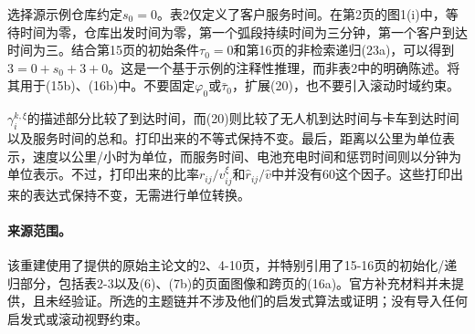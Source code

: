 \documentclass[10pt]{article}
\begin{document}
选择源示例仓库约定$s_0=0$。表2仅定义了客户服务时间。在第2页的图1(i)中，等待时间为零，仓库出发时间为零，第一个弧段持续时间为三分钟，第一个客户到达时间为三。结合第15页的初始条件$\tau_0=0$和第16页的非检索递归(23a)，可以得到$3=0+s_0+3+0$。这是一个基于示例的注释性推理，而非表2中的明确陈述。将其用于(15b)、(16b)中。不要固定$\varphi_0$或$\bar\tau_0$，扩展(20)，也不要引入滚动时域约束。

$\gamma_i^{k,\xi}$的描述部分比较了到达时间，而(20)则比较了无人机到达时间与卡车到达时间以及服务时间的总和。打印出来的不等式保持不变。最后，距离以公里为单位表示，速度以公里/小时为单位，而服务时间、电池充电时间和惩罚时间则以分钟为单位表示。不过，打印出来的比率$r_{ij}/v_{ij}^\xi$和$\hat r_{ij}/\hat v$中并没有60这个因子。这些打印出来的表达式保持不变，无需进行单位转换。

\paragraph{来源范围。}
该重建使用了提供的原始主论文的2、4-10页，并特别引用了15-16页的初始化/递归部分，包括表2-3以及(6)、(7b)的页面图像和跨页的(16a)。官方补充材料并未提供，且未经验证。所选的主题链并不涉及他们的启发式算法或证明；没有导入任何启发式或滚动视野约束。
\end{document}
